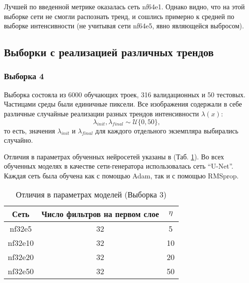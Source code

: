 			Лучшей по введенной метрике оказалась сеть nf64e1. Однако видно, что на этой выборке сети не смогли распознать тренд, и сошлись примерно к средней по выборке интенсивности (не учитывая сети nf64e5, явно являющейся выбросом).
		
	\subsection{Выборки с реализацией различных трендов}
		\subsubsection{Выборка 4}
			Выборка состояла из 6000 обучающих троек, 316 валидационных и 50 тестовых. Частицами среды были единичные пиксели. Все изображения содержали в себе различные случайные реализации разных трендов интенсивности $\lambda(x)$:
			$$ \lambda_{init}, \lambda_{final} \sim \mathcal{U}\{0, 50\}, $$
			то есть, значения $\lambda_{init}$ и $\lambda_{final}$ для каждого отдельного экземпляра выбирались случайно.
			
			Отличия в параметрах обученных нейросетей указаны в (Таб. \ref{8-dust-trend2-nns}). Во всех обученных моделях в качестве сети-генератора использовалась сеть ``U-Net''. Каждая сеть была обучена как с помощью Adam, так и с помощью RMSprop.
			
			\begin{table}[h!]
				\begin{center}
					\begin{tabular}{|c|c|c|}
						\hline
						Сеть & Число фильтров на первом слое & $\eta$ \\
						\hline
						nf32e5 & 32 & 5 \\
						\hline
						nf32e10 & 32 & 10 \\
						\hline
						nf32e20 & 32 & 20 \\
						\hline
						nf32e50 & 32 & 50 \\
						\hline
					\end{tabular}
					\caption{Отличия в параметрах моделей (Выборка 3)}
					\label{8-dust-trend2-nns}
				\end{center}
			\end{table}
			

